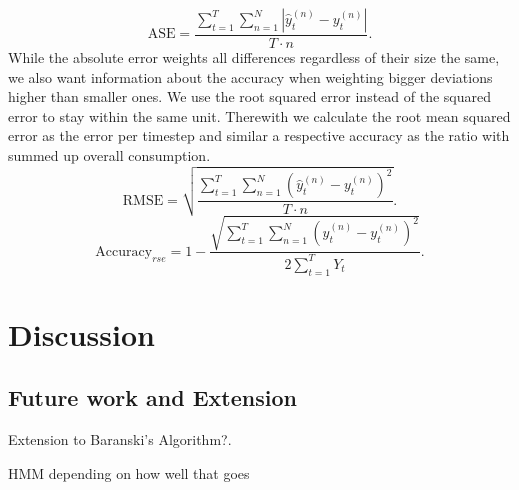 \documentclass{article}
\begin{document}
\[\textrm{ASE} = \frac{\sum^{T}_{t=1}\sum^{N}_{n=1}|\hat{y}^{(n)}_t-y^{(n)}_t|}{T \cdot n} .  \]
While the absolute error weights all differences regardless of their size the same, we also want information about the accuracy when 
weighting bigger deviations higher than smaller ones. We use the root squared error instead of the squared error 
to stay within the same unit. Therewith we calculate the root mean squared error as the error per timestep and similar a respective 
accuracy as the ratio with summed up overall consumption.
\[\textrm{RMSE} = \sqrt{\frac{\sum^{T}_{t=1}\sum^{N}_{n=1}(\hat{y}^{(n)}_t-y^{(n)}_t)^2}{T \cdot n}} .  \]
\[\textrm{Accuracy}_{rse} = 1- \frac{\sqrt{\sum^{T}_{t=1}\sum^{N}_{n=1}(\hat{y}^{(n)}_t-y^{(n)}_t)^2}}{2 \sum^{T}_{t=1}Y_t} .  \]












\section{Discussion}

\subsection{Future work and Extension}

Extension to Baranski's Algorithm?.

HMM depending on how well that goes




\end{document}
